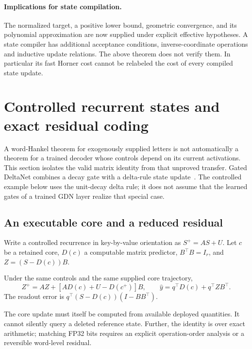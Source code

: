 \paragraph{Implications for state compilation.}
The normalized target, a positive lower bound, geometric convergence,
and its polynomial approximation are now supplied under explicit
effective hypotheses. A state compiler has additional acceptance
conditions, inverse-coordinate operations and inductive update
relations. The above theorem does not verify them. In particular its
fast Horner cost cannot be relabeled the cost of every compiled state update.

\section{Controlled recurrent states and exact residual coding}\label{III:U:sec:gdn}
A word-Hankel theorem for exogenously supplied letters is not automatically
a theorem for a trained decoder whose controls depend on its current
activations. This section isolates the valid matrix identity from that
unproved transfer. Gated DeltaNet combines a decay gate with a delta-rule
state update~\citep{yang2025gated}. The controlled example below uses
the unit-decay delta rule; it does not assume that the learned gates of
a trained GDN layer realize that special case.

\subsection{An executable core and a reduced residual}
Write a controlled recurrence in key-by-value orientation as
$S^+=AS+U$. Let $c$ be a retained core, $D(c)$ a computable matrix
predictor, $B^\top B=I_r$, and $Z=(S-D(c))B$.
\begin{proposition}\label{III:U:prop:core}
Under the same controls and the same supplied core trajectory,
\[
 Z^+=AZ+[AD(c)+U-D(c^+)]B,
 \qquad \widehat y=q^\top D(c)+q^\top ZB^\top.
\]
The readout error is
$q^\top(S-D(c))(I-BB^\top)$.
\end{proposition}

The core update must itself be computed from available deployed quantities.
It cannot silently query a deleted reference state. Further, the identity
is over exact arithmetic; matching FP32 bits requires an explicit
operation-order analysis or a reversible word-level residual.

